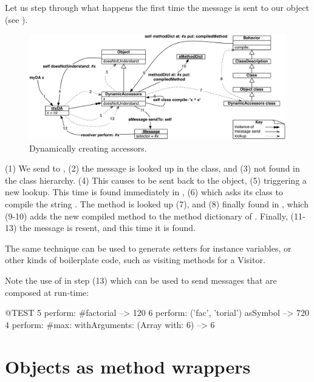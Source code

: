 \documentclass[a4paper,10pt,twoside]{book}
\begin{document}
Let us step through what happens the first time the message  is sent to our object (see ).

\begin{figure}[ht]\centering
	\includegraphics[width=\linewidth]{DynamicAccessors}
	\caption{Dynamically creating accessors. }
\end{figure}

(1) We send  to , (2) the message is looked up in the class, and (3) not found in the class hierarchy. (4) This causes  to be sent back to the object, (5) triggering a new lookup. This time  is found immediately in , (6) which asks its class to compile the string . The  method is looked up (7), and (8) finally found in , which (9-10) adds the new compiled method to the method dictionary of . Finally, (11-13) the message is resent, and this time it is found.

The same technique can be used to generate setters for instance variables, or other kinds of boilerplate code, such as visiting methods for a Visitor.

Note the use of  in step (13) which can be used to send messages that are composed at run-time:

\begin{code}{@TEST}
5 perform: #factorial                                             --> 120
6 perform: ('fac', 'torial') asSymbol                       --> 720
4 perform: #max: withArguments: (Array with: 6) --> 6
\end{code}

\section{Objects as method wrappers}
\end{document}
